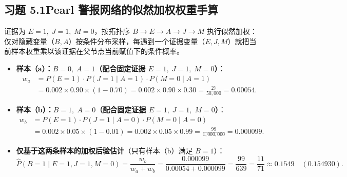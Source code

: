 \subsection*{习题 5.1\quad Pearl 警报网络的似然加权权重手算}
证据为 $E = 1,\; J = 1,\; M = 0$，按拓扑序 $B \to E \to A \to J \to M$ 执行似然加权：仅对隐藏变量（$B, A$）按条件分布采样，每遇到一个证据变量（$E, J, M$）就把当前样本权重乘以该证据在父节点当前赋值下的条件概率。
\begin{itemize}
  \item \textbf{样本（a）：$B=0,\; A=1$（配合固定证据 $E=1,\; J=1,\; M=0$）}：
  \begin{align*}
    w_a &= P(E=1) \cdot P(J=1 \mid A=1) \cdot P(M=0 \mid A=1) \\
        &= 0.002 \times 0.90 \times (1 - 0.70)
        = 0.002 \times 0.90 \times 0.30
        = \frac{27}{50{,}000} = \mathbf{0.00054}.
  \end{align*}
  \item \textbf{样本（b）：$B=1,\; A=0$（配合固定证据 $E=1,\; J=1,\; M=0$）}：
  \begin{align*}
    w_b &= P(E=1) \cdot P(J=1 \mid A=0) \cdot P(M=0 \mid A=0) \\
        &= 0.002 \times 0.05 \times (1 - 0.01)
        = 0.002 \times 0.05 \times 0.99
        = \frac{99}{1{,}000{,}000} = \mathbf{0.000099}.
  \end{align*}
  \item \textbf{仅基于这两条样本的加权后验估计}（只有样本（b）满足 $B=1$）：
  \[
    \hat{P}(B=1 \mid E=1, J=1, M=0)
    = \frac{w_b}{w_a + w_b}
    = \frac{0.000099}{0.00054 + 0.000099}
    = \frac{99}{639} = \frac{11}{71} \approx \mathbf{0.1549}\quad (0.154930).
  \]
\end{itemize}

